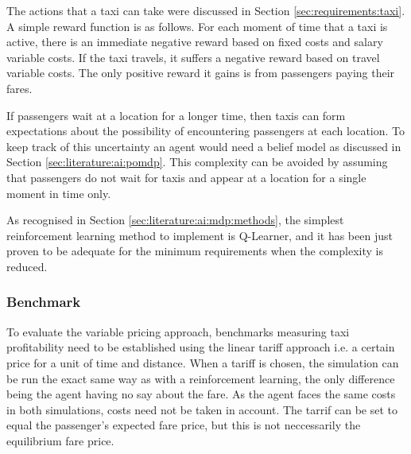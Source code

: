 The actions that a taxi can take were discussed in Section
\ref{sec:requirements:taxi}. A simple reward function is as follows. For each
moment of time that a taxi is active, there is an immediate negative reward
based on fixed costs and salary variable costs. If the taxi travels, it suffers
a negative reward based on travel variable costs. The only positive reward it
gains is from passengers paying their fares.

If passengers wait at a location for a longer time, then taxis can form
expectations about the possibility of encountering passengers at each location.
To keep track of this uncertainty an agent would need a belief model as
discussed in Section \ref{sec:literature:ai:pomdp}. This complexity can be
avoided by assuming that passengers do not wait for taxis and appear at a
location for a single moment in time only.

As recognised in Section \ref{sec:literature:ai:mdp:methods}, the simplest
reinforcement learning method to implement is Q-Learner, and it has been just
proven to be adequate for the minimum requirements when the complexity is
reduced.


\subsubsection{Benchmark} 
\label{sec:requirements:benchmark}

To evaluate the variable pricing approach, benchmarks measuring taxi
profitability need to be established using the linear tariff approach i.e. a
certain price for a unit of time and distance. When a tariff is chosen, the
simulation can be run the exact same way as with a reinforcement learning, the
only difference being the agent having no say about the fare. As the agent
faces the same costs in both simulations, costs need not be taken in account.
The tarrif can be set to equal the passenger's expected fare price, but this is
not neccessarily the equilibrium fare price.


